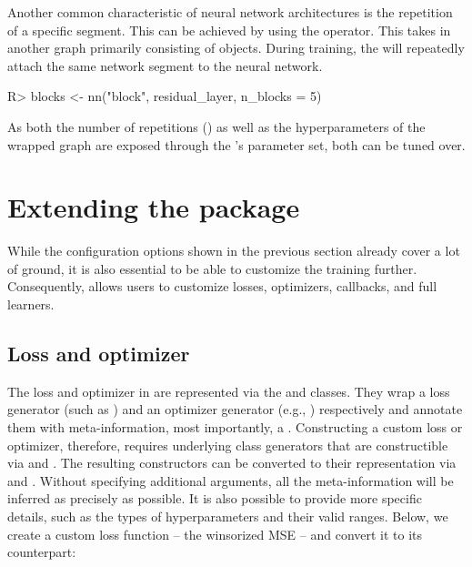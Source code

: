 \documentclass[article]{jss}
\theoremstyle{definition}
\begin{document}
Another common characteristic of neural network architectures is the repetition of a specific segment.
This can be achieved by using the  operator.
This  takes in another graph primarily consisting of  objects.
During training, the  will repeatedly attach the same network segment to the neural network.

\begin{CodeInput}
R> blocks <- nn("block", residual_layer, n_blocks = 5)
\end{CodeInput}

As both the number of repetitions () as well as the hyperparameters of the wrapped graph are exposed through the 's parameter set, both can be tuned over.

\section{Extending the package}\label{sec:extending}

While the configuration options shown in the previous section already cover a lot of ground, it is also essential to be able to customize the training further.
Consequently,  allows users to customize losses, optimizers, callbacks, and full learners.

\subsection{Loss and optimizer}\label{sec:extending-loss-opt}

The loss and optimizer in \mlrttorch{} are represented via the  and  classes.
They wrap a loss generator (such as ) and an optimizer generator (e.g., ) respectively and annotate them with meta-information, most importantly, a .
Constructing a custom loss or optimizer, therefore, requires underlying class generators that are constructible via  and .
The resulting constructors can be converted to their \mlrttorch{} representation via  and .
Without specifying additional arguments, all the meta-information will be inferred as precisely as possible.
It is also possible to provide more specific details, such as the types of hyperparameters and their valid ranges.
Below, we create a custom  loss function -- the winsorized MSE -- and convert it to its \mlrttorch{} counterpart:
\end{document}
